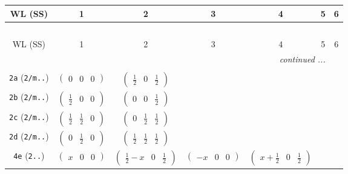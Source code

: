 \documentclass[fleqn,9pt,landscape]{jsarticle}
\begin{document}
\begin{center}
\renewcommand{\arraystretch}{1.2}
\begin{longtable}{ccccccc}
 \hline \hline
WL (SS) & 1 & 2 & 3 & 4 & 5 & 6 \\ \hline \endfirsthead

\multicolumn{6}{l}{\tablename\ \thetable{}} \\
 \hline \hline
WL (SS) & 1 & 2 & 3 & 4 & 5 & 6 \\ \hline \endhead

 \hline \hline
\multicolumn{6}{r}{\footnotesize\it continued ...} \\ \endfoot

 \hline \hline
\multicolumn{6}{r}{} \\ \endlastfoot

{\tt 2a} ({\tt 2/m..}) & $ \begin{pmatrix} 0 & 0 & 0 \end{pmatrix} $ & $ \begin{pmatrix} \frac{1}{2} & 0 & \frac{1}{2} \end{pmatrix} $ & $  $ & $  $ & $  $ & $  $ \\ \hline
{\tt 2b} ({\tt 2/m..}) & $ \begin{pmatrix} \frac{1}{2} & 0 & 0 \end{pmatrix} $ & $ \begin{pmatrix} 0 & 0 & \frac{1}{2} \end{pmatrix} $ & $  $ & $  $ & $  $ & $  $ \\ \hline
{\tt 2c} ({\tt 2/m..}) & $ \begin{pmatrix} \frac{1}{2} & \frac{1}{2} & 0 \end{pmatrix} $ & $ \begin{pmatrix} 0 & \frac{1}{2} & \frac{1}{2} \end{pmatrix} $ & $  $ & $  $ & $  $ & $  $ \\ \hline
{\tt 2d} ({\tt 2/m..}) & $ \begin{pmatrix} 0 & \frac{1}{2} & 0 \end{pmatrix} $ & $ \begin{pmatrix} \frac{1}{2} & \frac{1}{2} & \frac{1}{2} \end{pmatrix} $ & $  $ & $  $ & $  $ & $  $ \\ \hline
{\tt 4e} ({\tt 2..}) & $ \begin{pmatrix} x & 0 & 0 \end{pmatrix} $ & $ \begin{pmatrix} \frac{1}{2} - x & 0 & \frac{1}{2} \end{pmatrix} $ & $ \begin{pmatrix} - x & 0 & 0 \end{pmatrix} $ & $ \begin{pmatrix} x + \frac{1}{2} & 0 & \frac{1}{2} \end{pmatrix} $ & $  $ & $  $ \\ \hline

\end{longtable}
\end{center}
\end{document}

